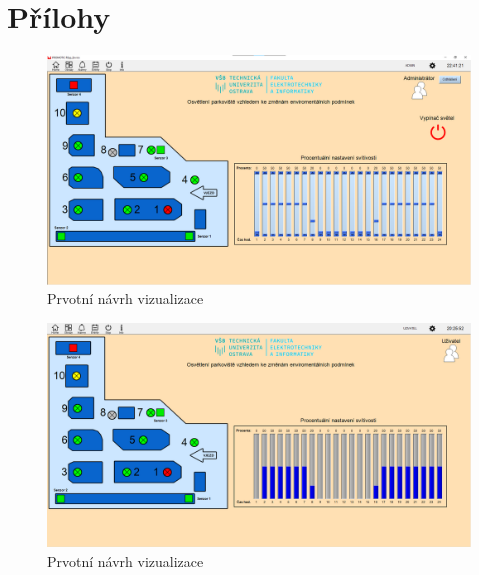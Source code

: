 \chapter{Přílohy}
\label{Sec-Prilohy}

\begin{figure}[ht]
    \centering\includegraphics[height=.8\textwidth,angle=-90]{Figures/Promotic_admin_vizualizace.png}   
    \caption{Prvotní návrh vizualizace}
    \label{Obr-Viz_admin-01}
\end{figure}

\begin{figure}[ht]
    \centering\includegraphics[height=.8\textwidth,angle=-90]{Figures/Promotic_uzivatel_vizualizace.png}   
    \caption{Prvotní návrh vizualizace}
    \label{Obr-Viz_oper-01}
\end{figure}



\endinput